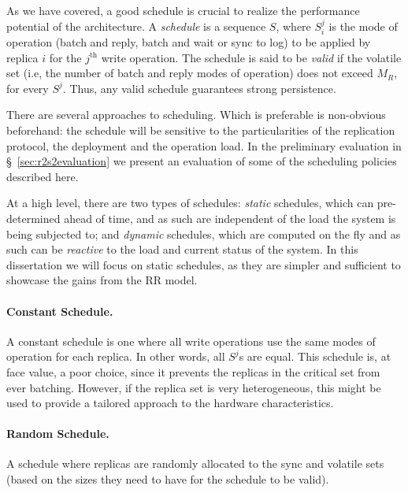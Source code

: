 As we have covered, a good schedule is crucial to realize the
performance potential of the architecture. A \emph{schedule} is a
sequence $S$, where $S_i^j$ is the mode of operation (batch and
reply, batch and wait or sync to log) to be applied by replica
$i$ for the $j^\text{th}$ write operation. The
schedule is said to be \emph{valid} if the volatile set (i.e,
the number of batch and reply modes of operation) does not exceed
$M_R$, for every $S^j$. Thus, any valid schedule guarantees
strong persistence.

There are several approaches to scheduling. Which is preferable
is non-obvious beforehand: the schedule will be sensitive to the
particularities of the replication protocol, the deployment and
the operation load. In the preliminary evaluation in
\S~\ref{sec:r2s2evaluation} we present an
evaluation of some of the scheduling policies described
here.

At a high level, there are two types of schedules: \emph{static}
schedules, which can pre-determined ahead of time, and as such
are independent of the load the system is being subjected to; and
\emph{dynamic} schedules, which are computed on the fly and as
such can be \emph{reactive} to the load and current status of the
system. In this dissertation we will focus on static schedules,
as they are simpler and sufficient to showcase the gains from the
\ac{RR} model.

\paragraph{Constant Schedule.} A constant schedule is one where
all write operations use the same modes of operation for each
replica. In other words, all $S^j$s are equal. This schedule is,
at face value, a poor choice, since it prevents the replicas in the
critical set from ever batching. However, if the replica set is
very heterogeneous, this might be used to provide a tailored
approach to the hardware characteristics.

\paragraph{Random Schedule.} A schedule where replicas are
randomly allocated to the sync and volatile sets (based on the
sizes they need to have for the schedule to be valid).

